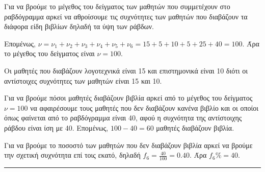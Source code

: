 
\begin{alist}
    \item Για να βρούμε το μέγεθος του δείγματος των μαθητών που συμμετέχουν στο ραβδόγραμμα αρκεί να αθροίσουμε τις συχνότητες των μαθητών που διαβάζουν τα διάφορα είδη βιβλίων δηλαδή τα ύψη των ράβδων.
    
    Επομένως, $\nu=\nu_1 + \nu_2 + \nu_3 + \nu_4 + \nu_5 + \nu_6 =15+5+10+5+25+40=100$. Άρα το μέγεθος του δείγματος είναι $\nu=100$.
    
    \item Οι μαθητές που διαβάζουν λογοτεχνικά είναι 15 και επιστημονικά είναι 10 διότι οι αντίστοιχες συχνότητες των μαθητών είναι 15 και 10.
    
    \item 
    \begin{rlist}
        \item Για να βρούμε πόσοι μαθητές διαβάζουν βιβλία αρκεί από το μέγεθος του δείγματος $\nu=100$ να αφαιρέσουμε τους μαθητές που δεν διαβάζουν κανένα βιβλίο και οι οποίοι όπως φαίνεται από το ραβδόγραμμα είναι 40, αφού η συχνότητα της αντίστοιχης ράβδου είναι ίση με 40. Επομένως, $100-40=60$ μαθητές διαβάζουν βιβλία.
        \item Για να βρούμε το ποσοστό των μαθητών που δεν διαβάζουν βιβλία αρκεί να βρούμε την σχετική συχνότητα επί τοις εκατό, δηλαδή $f_{6} = \frac{40}{100} = 0.40$. Άρα $f_{6}\% = 40$.
    \end{rlist}
\end{alist}
\vspace{6mm}
\noindent\rule{\textwidth}{0.4pt}
\vspace{6mm}

